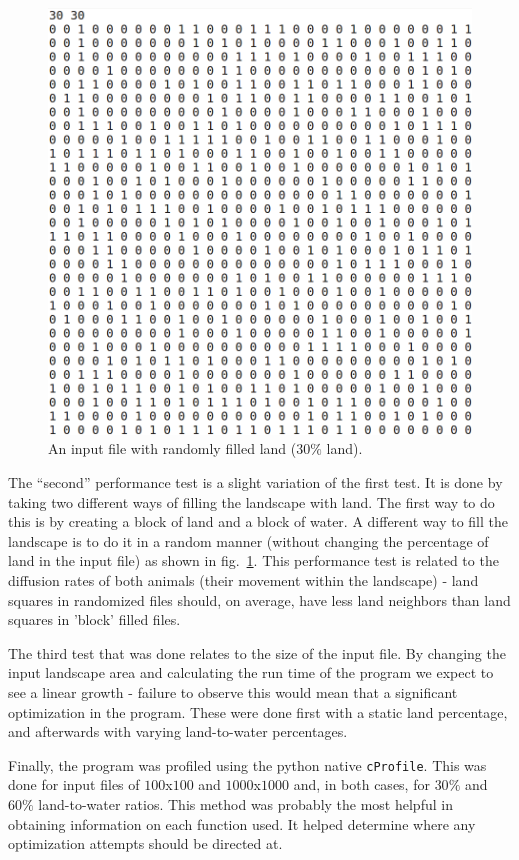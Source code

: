\documentclass[12pt,a4paper]{article}
\begin{document}
\begin{figure}[ht]
\begin{minipage}[b]{0.475\linewidth}
\includegraphics[width=\textwidth]{img/input_rand.png}
\caption{An input file with randomly filled land ($30\%$ land).}
\label{fig:2}
\end{minipage}
\end{figure}

The ``second'' performance test is a slight variation of the first test. It is 
done by taking two different ways of filling the landscape with land. The first 
way to do this is by creating a block of land and a block of water. A different 
way to fill the landscape is to do it in a random manner (without changing the 
percentage of land in the input file) as shown in fig.~\ref{fig:2}. This 
performance test is related to the diffusion rates of both animals (their 
movement within the landscape) - land 
squares in randomized files should, on average, have less land neighbors than 
land squares in 'block' filled files. 

The third test that was done relates to the size of the input file. By changing 
the input landscape area and calculating the run time of the program we expect 
to see a linear growth - failure to observe this would mean that a significant 
optimization in the program. These were done first with a static land 
percentage, and afterwards with varying land-to-water percentages.

Finally, the program was profiled using the python native \texttt{cProfile}. 
This was done for input files of $100$x$100$ and $1000$x$1000$ and, in both 
cases, for $30\%$ and $60\%$ land-to-water ratios. This method was probably the 
most helpful in obtaining information on each function used. It helped 
determine where any optimization attempts should be directed at.
\end{document}
